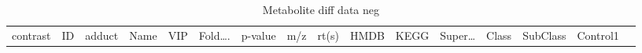 \documentclass[
]{article}
\begin{document}
\begin{longtable}[]{@{}llllllllllllllll@{}}
\caption{\label{tab:metabolite-diff-data-neg}Metabolite diff data neg}\tabularnewline
\toprule
\begin{minipage}[b]{0.04\columnwidth}\raggedright
contrast\strut
\end{minipage} & \begin{minipage}[b]{0.04\columnwidth}\raggedright
ID\strut
\end{minipage} & \begin{minipage}[b]{0.04\columnwidth}\raggedright
adduct\strut
\end{minipage} & \begin{minipage}[b]{0.04\columnwidth}\raggedright
Name\strut
\end{minipage} & \begin{minipage}[b]{0.04\columnwidth}\raggedright
VIP\strut
\end{minipage} & \begin{minipage}[b]{0.04\columnwidth}\raggedright
Fold\ldots.\strut
\end{minipage} & \begin{minipage}[b]{0.04\columnwidth}\raggedright
p-value\strut
\end{minipage} & \begin{minipage}[b]{0.04\columnwidth}\raggedright
m/z\strut
\end{minipage} & \begin{minipage}[b]{0.04\columnwidth}\raggedright
rt(s)\strut
\end{minipage} & \begin{minipage}[b]{0.04\columnwidth}\raggedright
HMDB\strut
\end{minipage} & \begin{minipage}[b]{0.03\columnwidth}\raggedright
KEGG\strut
\end{minipage} & \begin{minipage}[b]{0.04\columnwidth}\raggedright
Super\ldots{}\strut
\end{minipage} & \begin{minipage}[b]{0.04\columnwidth}\raggedright
Class\strut
\end{minipage} & \begin{minipage}[b]{0.04\columnwidth}\raggedright
SubClass\strut
\end{minipage} & \begin{minipage}[b]{0.04\columnwidth}\raggedright
Control1\strut
\end{minipage} & \begin{minipage}[b]{0.02\columnwidth}\raggedright

\end{minipage}
\end{longtable}
\end{document}
